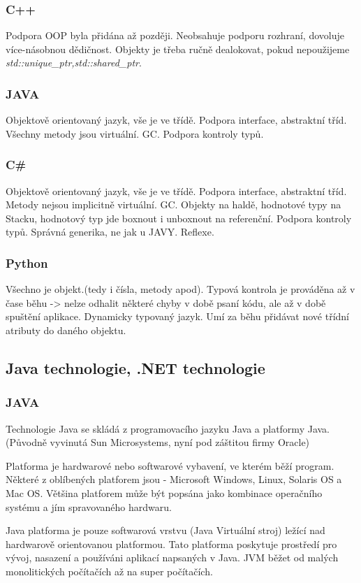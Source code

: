 \subsubsection{C++}
Podpora OOP byla přidána až později. Neobsahuje podporu rozhraní, dovoluje více-násobnou dědičnost. Objekty je třeba ručně dealokovat, pokud nepoužijeme \textit{std::unique\_ptr,std::shared\_ptr}.
\subsubsection{JAVA}
Objektově orientovaný jazyk, vše je ve třídě. Podpora interface, abstraktní tříd. Všechny metody jsou virtuální. GC. Podpora kontroly typů.
\subsubsection{C\#}
Objektově orientovaný jazyk, vše je ve třídě. Podpora interface, abstraktní tříd. Metody nejsou implicitně virtuální. GC. Objekty na haldě, hodnotové typy na Stacku, hodnotový typ jde boxnout i unboxnout na referenční.  Podpora kontroly typů. Správná generika, ne jak u JAVY. Reflexe.
\subsubsection{Python}
Všechno je objekt.(tedy i čísla, metody apod). Typová kontrola je prováděna až v čase běhu -> nelze odhalit některé chyby v době psaní kódu, ale až v době spuštění aplikace. Dynamicky typovaný jazyk. Umí za běhu přidávat nové třídní atributy do daného objektu.
\subsection{Java technologie, .NET technologie}
\subsubsection{JAVA}
Technologie Java se skládá z programovacího jazyku Java a platformy Java. (Původně vyvinutá Sun Microsystems, nyní pod záštitou firmy Oracle)

Platforma je hardwarové nebo softwarové vybavení, ve kterém běží program. Některé z oblíbených platforem jsou - Microsoft Windows, Linux, Solaris OS a Mac OS. Většina platforem může být popsána jako kombinace operačního systému a jím spravovaného hardwaru. 

Java platforma je pouze softwarová vrstvu (Java Virtuální stroj) ležící nad hardwarově orientovanou platformou. Tato platforma poskytuje prostředí pro vývoj, nasazení a používáni aplikací napsaných v Java. JVM běžet od malých monolitických počítačích až na super počítačích. 


